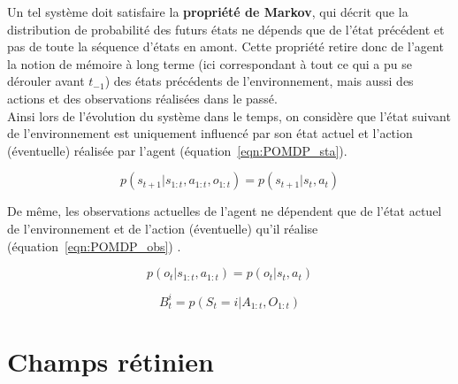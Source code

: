 Un tel système doit satisfaire la \textbf{propriété de Markov}, qui décrit que la distribution de probabilité des futurs états ne dépends que de l'état précédent et pas de toute la séquence d'états en amont. Cette propriété retire donc de l'agent la notion de mémoire à long terme (ici correspondant à tout ce qui a pu se dérouler avant $t_{-1}$) des états précédents de l'environnement, mais aussi des actions et des observations réalisées dans le passé. \autocite{Butko2010}\\
Ainsi lors de l'évolution du système dans le temps, on considère que l'état suivant de l'environnement est uniquement influencé par son état actuel et l'action (éventuelle) réalisée par l'agent (équation~\ref{eqn:POMDP_sta}). \autocite{Butko2010, Potthast2016} 

\begin{equation}
p(s_{t+1}|s_{1:t},a_{1:t},o_{1:t}) = p(s_{t+1}|s_{t},a_{t})
\label{eqn:POMDP_sta}
\end{equation}

De même, les observations actuelles de l'agent ne dépendent que de l'état actuel de l'environnement et de l'action (éventuelle) qu'il réalise (équation~\ref{eqn:POMDP_obs}) \autocite{Butko2010}.

\begin{equation}
p(o_{t}|s_{1:t},a_{1:t}) = p(o_{t}|s_{t},a_{t})
\label{eqn:POMDP_obs}
\end{equation}

\begin{equation}
B_{t}^i = p(S_{t} = i|A_{1:t},O_{1:t})
\label{eqn:POMDP_bel}
\end{equation}


\section{Champs rétinien} %

